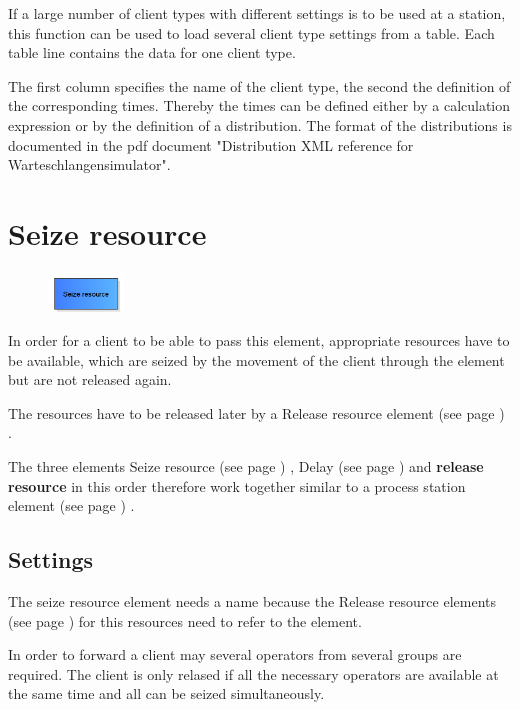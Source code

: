 If a large number of client types with different settings is to be used at a station, this function can be used
to load several client type settings from a table. Each table line contains the data for one client type.

The first column specifies the name of the client type, the second the definition of the corresponding times.
Thereby the times can be defined either by a calculation expression or by the definition of a
distribution. The format of the distributions is documented in the pdf document
"Distribution XML reference for Warteschlangensimulator".


\section{Seize resource}
\label{ref:ModelElementSeize}

\begin{figure}
\vspace{-22pt}
\includegraphics[width=2cm]{imageModelElementSeize.png}
\vspace{-22pt}
\end{figure}

In order for a client to be able to pass this element, appropriate resources have to be available,
which are seized by the movement of the client through the element but are not released again.

The resources have to be released later by a Release resource element (see page \pageref{ref:ModelElementRelease}) .

The three elements Seize resource (see page \pageref{ref:ModelElementSeize}) , Delay (see page \pageref{ref:ModelElementDelay}) and
\textbf{release resource} in this order therefore work together similar to a
process station element (see page \pageref{ref:ModelElementProcess}) .

\subsection*{Settings}

The seize resource element needs a name because the Release resource elements (see page \pageref{ref:ModelElementRelease}) 
for this resources need to refer to the element.

In order to forward a client may several operators from several groups are required.
The client is only relased if all the necessary operators are available at the same
time and all can be seized simultaneously.

